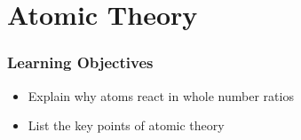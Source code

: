 \documentclass[notes=only]{beamer}
\begin{document}
%	

\section{Atomic Theory}

\begin{frame}
	\frametitle{Learning Objectives}

	\begin{itemize}
		\item Explain why atoms react in whole number ratios
		\item List the key points of atomic theory
	\end{itemize}
\end{frame}


%
%
%
\end{document}
